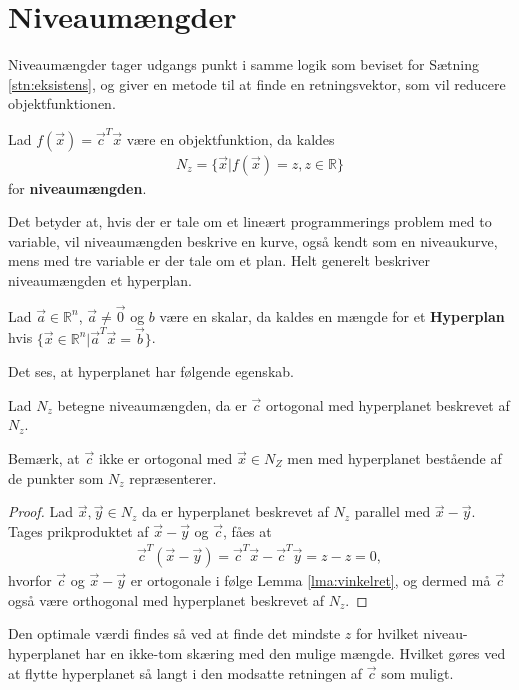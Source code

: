 \section{Niveaumængder}
Niveaumængder tager udgangs punkt i samme logik som beviset for Sætning \ref{stn:eksistens}, og giver en metode til at finde en retningsvektor, som vil reducere objektfunktionen.
\begin{defn}[Niveaumængden]
Lad $f(\vec{x})= \vec{c}^T\vec{x}$ være en objektfunktion, da kaldes
\begin{align*}
N_z = \{\vec{x}| f(\vec{x}) = z, z \in \mathds{R}\}
\end{align*}
for \textbf{niveaumængden}.
\end{defn}
Det betyder at, hvis der er tale om et lineært programmerings problem med to variable, vil niveaumængden beskrive en kurve, også kendt som en niveaukurve, mens med tre variable er der tale om et plan. 
Helt generelt beskriver niveaumængden et hyperplan.
\begin{defn}[Hyperplan]
Lad $ \vec{a} \in \mathds{R}^n$, $\vec{a}\neq \vec{0}$ og $b$ være en skalar, da kaldes en mængde for et \textbf{Hyperplan} hvis $\{ \vec{x} \in \mathds{R}^n | \vec{a}^{T}\vec{x} = \vec{b}\}$.
\end{defn}
Det ses, at hyperplanet har følgende egenskab.
\begin{stn}
Lad $N_z$ betegne niveaumængden, da er $\vec{c}$ ortogonal med hyperplanet beskrevet af $N_z$.
\end{stn}
Bemærk, at $\vec{c}$ ikke er ortogonal med $\vec{x}\in N_Z$ men med hyperplanet bestående af de punkter som $N_z$ repræsenterer.
\begin{proof}
Lad $\vec{x}, \vec{y} \in N_z$ da er hyperplanet beskrevet af $N_z$ parallel med $\vec{x}-\vec{y}$.
Tages prikproduktet af $\vec{x}-\vec{y}$ og $\vec{c}$, fåes at
\begin{align*}
\vec{c}^T(\vec{x}-\vec{y}) = \vec{c}^T\vec{x} -\vec{c}^T\vec{y} = z - z = 0,
\end{align*}
hvorfor $\vec{c}$ og $\vec{x}-\vec{y}$ er ortogonale i følge Lemma \ref{lma:vinkelret}, og dermed må $\vec{c}$ også være orthogonal med hyperplanet beskrevet af $N_z$.
\end{proof}
Den optimale værdi findes så ved at finde det mindste $z$ for hvilket niveau-hyperplanet har en ikke-tom skæring med den mulige mængde. 
Hvilket gøres ved at flytte hyperplanet så langt i den modsatte retningen af $\vec{c}$ som muligt.
